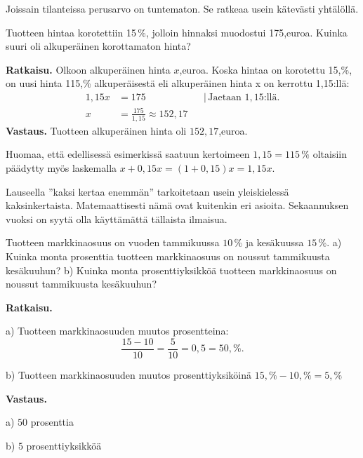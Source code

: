 Joissain tilanteissa perusarvo on tuntematon. Se ratkeaa usein kätevästi yhtälöllä.
\begin{esimerkki}
Tuotteen hintaa korotettiin 15\,\%, jolloin hinnaksi muodostui 175,euroa. Kuinka suuri oli alkuperäinen korottamaton hinta?

\textbf{Ratkaisu.} 
Olkoon alkuperäinen hinta $x$,euroa. Koska hintaa on korotettu 15,\%, on uusi hinta 115,\% alkuperäisestä eli alkuperäinen hinta x on kerrottu 1,15:llä:
\begin{align*}
	1,15x	&= 175	&	&|\, \text{Jaetaan $1,15$:llä.} \\
	x	&= \frac{175}{1,15} \approx 152,17
\end{align*}
    \textbf{Vastaus.}
    Tuotteen alkuperäinen hinta oli $152,17$,euroa.
\end{esimerkki}

Huomaa, että edellisessä esimerkissä saatuun kertoimeen $1,15 = 115\,\%$ oltaisiin päädytty myös laskemalla $x + 0,15x = (1 + 0,15)x = 1,15x$.

Lauseella ''kaksi kertaa enemmän'' tarkoitetaan usein yleiskielessä kaksinkertaista.
Matemaattisesti nämä ovat kuitenkin eri asioita.
Sekaannuksen vuoksi on syytä olla käyttämättä tällaista ilmaisua.


\begin{esimerkki}
    Tuotteen markkinaosuus on vuoden tammikuussa $10$\,\% ja kesäkuussa $15$\,\%.
    \newline a) Kuinka monta prosenttia tuotteen markkinaosuus on noussut tammikuusta kesäkuuhun?
    \newline b) Kuinka monta prosenttiyksikköä tuotteen markkinaosuus on noussut tammikuusta kesäkuuhun?

    \textbf{Ratkaisu.}
    
a) Tuotteen markkinaosuuden muutos prosentteina:
          \[
                \frac{15-10}{10} = \frac{5}{10} = 0,5 = 50,\%.
          \]
  
b) Tuotteen markkinaosuuden muutos prosenttiyksiköinä $15,\%-10,\%=5,\%$

\textbf{Vastaus.}

a) $50$ prosenttia

b) $5$ prosenttiyksikköä
\end{esimerkki}
